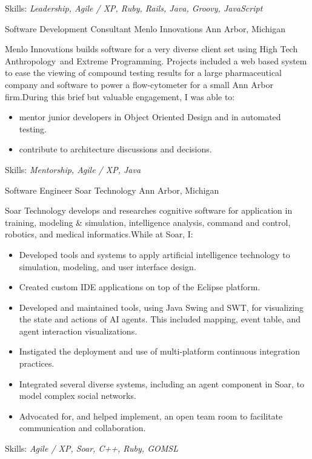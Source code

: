 \documentclass[11pt,letterpaper]{moderncv}
\begin{document}
\begin{list}{}{\small\setlength{\leftmargin}{3.2cm}\setlength{\topsep}{0cm}}
  \item Skills: \emph{Leadership, Agile / XP, Ruby, Rails, Java, Groovy, JavaScript}
\end{list}


  {Software Development Consultant} {Menlo Innovations} {Ann Arbor, Michigan} {} {%
  Menlo Innovations builds software for a very diverse client set using High
  Tech Anthropology\textregistered \ and Extreme Programming.  Projects
  included a web based system to ease the viewing of compound testing results
  for a large pharmaceutical company and software to power a flow-cytometer
  for a small Ann Arbor firm.\newline During this brief but valuable engagement, I
  was able to:
  \begin{itemize}
  \item mentor junior developers in Object Oriented Design and in
    automated testing.
  \item contribute to architecture discussions and decisions.
  \end{itemize}
  Skills: \emph{Mentorship, Agile / XP, Java}
}

 {Software Engineer} {Soar Technology} {Ann Arbor, Michigan} {} {%
  Soar Technology develops and researches cognitive software for application
  in training, modeling \& simulation, intelligence analysis, command and
  control, robotics, and medical informatics.\newline While at Soar, I:
  \begin{itemize}
  \item Developed tools and systems to apply artificial intelligence
    technology to simulation, modeling, and user interface design.
  \item Created custom IDE applications on top of the Eclipse platform.
  \item Developed and maintained tools, using Java Swing and SWT, for
    visualizing the state and actions of AI agents. This included
    mapping, event table, and agent interaction visualizations.
  \item Instigated the deployment and use of multi-platform
    continuous integration practices.
  \item Integrated several diverse systems, including an agent
    component in Soar, to model complex social networks.
  \item Advocated for, and helped implement, an open team room to
    facilitate communication and collaboration.
  \end{itemize}
  Skills: \emph{Agile / XP, Soar, C++, Ruby, GOMSL}
}
\end{document}
